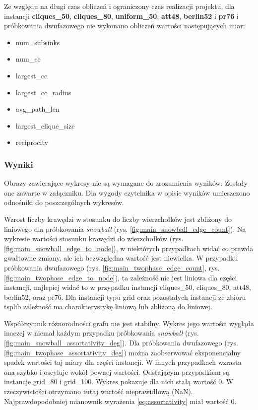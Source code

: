 Ze względu na długi czas obliczeń i ograniczony czas realizacji projektu,
dla instancji \textbf{cliques\_50}, \textbf{cliques\_80}, \textbf{uniform\_50}, \textbf{att48}, \textbf{berlin52} i \textbf{pr76} i próbkowania dwufazowego
nie wykonano obliczeń wartości następujących miar:

\begin{itemize}
    \item num\_subsinks
    \item num\_cc
    \item largest\_cc
    \item largest\_cc\_radius
    \item avg\_path\_len
    \item largest\_clique\_size
    \item reciprocity
\end{itemize}

\subsubsection{Wyniki}
Obrazy zawierające wykresy nie są wymagane do zrozumienia wyników.
Zostały one zawarte w załączniku. Dla wygody czytelnika w opisie wyników umieszczono odnośniki do poszczególnych wykresów.

Wzrost liczby krawędzi w stosunku do liczby wierzchołków jest zbliżony do liniowego dla próbkowania \textit{snowball} (rys. \ref{fig:main_snowball_edge_count}).
Na wykresie wartości stosunku krawędzi do wierzchołków (rys. \ref{fig:main_snowball_edge_to_node}), w niektórych przypadkach widać co prawda gwałtowne zmiany, ale
ich bezwzględna wartość jest niewielka.
W przypadku próbkowania dwufazowego (rys. \ref{fig:main_twophase_edge_count}, rys.\ref{fig:main_twophase_edge_to_node}), ta zależność nie jest liniowa dla części instancji,
najlepiej widać to w przypadku instancji cliques\_50, cliques\_80, att48, berlin52, oraz pr76.
Dla instancji typu grid oraz pozostałych instancji ze zbioru tsplib zależność ma charakterystykę liniową lub zbliżoną do liniowej.

Współczynnik różnorodności grafu nie jest stabilny. Wykres jego wartości wygląda inaczej w niemal każdym przypadku
próbkowania \textit{snowball} (rys. \ref{fig:main_snowball_assortativity_deg}).
Dla próbkowania dwufazowego (rys. \ref{fig:main_twophase_assortativity_deg}) można zaobserwować eksponencjalny spadek wartości taj miary dla części instancji.
W innych przypadkach wzrasta ona szybko i oscyluje wokół pewnej wartości.
Odstającym przypadkiem są instancje grid\_80 i grid\_100. Wykres pokazuje dla nich stałą wartość 0.
W rzeczywistości otrzymano tutaj wartość nieprawidłową (NaN). Najprawdopodobniej mianownik wyrażenia \ref{eq:assortativity}
miał wartość 0.

